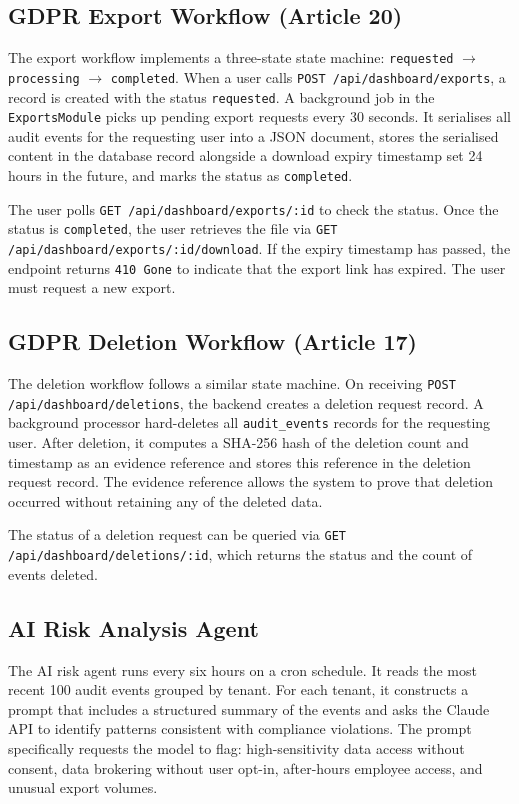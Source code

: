 \documentclass[a4paper,12pt,onecolumn]{report}
\begin{document}
\subsection{GDPR Export Workflow (Article 20)}

The export workflow implements a three-state state machine: \texttt{requested} $\to$ \texttt{processing} $\to$ \texttt{completed}.
When a user calls \texttt{POST /api/dashboard/exports}, a record is created with the status \texttt{requested}.
A background job in the \texttt{ExportsModule} picks up pending export requests every 30 seconds.
It serialises all audit events for the requesting user into a JSON document, stores the serialised content in the database record alongside a download expiry timestamp set 24 hours in the future, and marks the status as \texttt{completed}.

The user polls \texttt{GET /api/dashboard/exports/:id} to check the status.
Once the status is \texttt{completed}, the user retrieves the file via \texttt{GET /api/dashboard/exports/:id/download}.
If the expiry timestamp has passed, the endpoint returns \texttt{410 Gone} to indicate that the export link has expired.
The user must request a new export.

\subsection{GDPR Deletion Workflow (Article 17)}

The deletion workflow follows a similar state machine.
On receiving \texttt{POST /api/dashboard/deletions}, the backend creates a deletion request record.
A background processor hard-deletes all \texttt{audit\_events} records for the requesting user.
After deletion, it computes a SHA-256 hash of the deletion count and timestamp as an evidence reference and stores this reference in the deletion request record.
The evidence reference allows the system to prove that deletion occurred without retaining any of the deleted data.

The status of a deletion request can be queried via \texttt{GET /api/dashboard/deletions/:id}, which returns the status and the count of events deleted.

\subsection{AI Risk Analysis Agent}

The AI risk agent runs every six hours on a cron schedule.
It reads the most recent 100 audit events grouped by tenant.
For each tenant, it constructs a prompt that includes a structured summary of the events and asks the Claude API to identify patterns consistent with compliance violations.
The prompt specifically requests the model to flag: high-sensitivity data access without consent, data brokering without user opt-in, after-hours employee access, and unusual export volumes.
\end{document}
